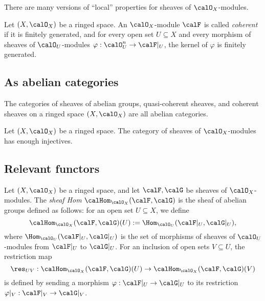     \begin{remark}\label{rmk:local_properties_of_sheaves}
        There are many versions of ``local'' properties for sheaves of \(\calO_X\)-modules.
    \end{remark}

    \begin{definition}\label{def:coherent_sheaf}
        Let \((X,\calO_X)\) be a ringed space.
        An \(\calO_X\)-module \(\calF\) is called \emph{coherent} if it is finitely generated, and for every open set \(U\subseteq X\) and every morphism of sheaves of \(\calO_U\)-modules \(\varphi:\calO_U^n \to \calF|_U\), the kernel of \(\varphi\) is finitely generated.
    \end{definition}

\subsection{As abelian categories}

    \begin{theorem}\label{thm:sheaves_of_ab_mod_qcoh_coh_are_abelian_categories}
        The categories of sheaves of abelian groups, quasi-coherent sheaves, and coherent sheaves on a ringed space \((X,\calO_X)\) are all abelian categories.
    \end{theorem}

    \begin{theorem}\label{thm:O_X_mod_has_enough_injectives}
        Let \((X,\calO_X)\) be a ringed space.
        The category of sheaves of \(\calO_X\)-modules has enough injectives.
    \end{theorem}

    

\subsection{Relevant functors}

    \begin{definition}\label{def:hom_sheaves}
        Let \((X,\calO_X)\) be a ringed space, and let \(\calF,\calG\) be sheaves of \(\calO_X\)-modules.
        The \emph{sheaf Hom} \(\calHom_{\calO_X}(\calF,\calG)\) is the sheaf of abelian groups defined as follows:
        for an open set \(U\subseteq X\), we define
        \[
            \calHom_{\calO_X}(\calF,\calG)(U) := \Hom_{\calO_U}(\calF|_U,\calG|_U),
        \]
        where \(\Hom_{\calO_U}(\calF|_U,\calG|_U)\) is the set of morphisms of sheaves of \(\calO_U\)-modules from \(\calF|_U\) to \(\calG|_U\).
        For an inclusion of open sets \(V\subseteq U\), the restriction map
        \[
            \res_{UV}:\calHom_{\calO_X}(\calF,\calG)(U) \to \calHom_{\calO_X}(\calF,\calG)(V)
        \]
        is defined by sending a morphism \(\varphi:\calF|_U \to \calG|_U\) to its restriction \(\varphi|_V:\calF|_V \to \calG|_V\).
    \end{definition}
    
